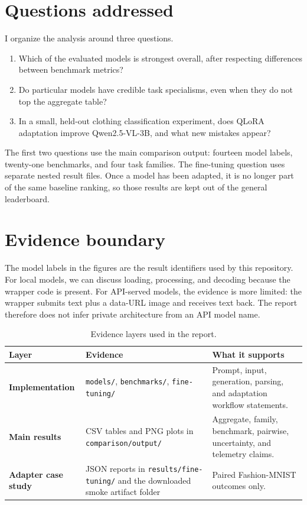 \documentclass[11pt,a4paper]{report}
\newcommand{\code}[1]{\texttt{#1}}
\begin{document}
\section{Questions addressed}
I organize the analysis around three questions.

\begin{enumerate}[leftmargin=22pt]
\item Which of the evaluated models is strongest overall, after respecting
      differences between benchmark metrics?
\item Do particular models have credible task specialisms, even when they do
      not top the aggregate table?
\item In a small, held-out clothing classification experiment, does QLoRA
      adaptation improve Qwen2.5-VL-3B, and what new mistakes appear?
\end{enumerate}

The first two questions use the main comparison output: fourteen model labels,
twenty-one benchmarks, and four task families.  The fine-tuning question uses
separate nested result files.  Once a model has been adapted, it is no longer
part of the same baseline ranking, so those results are kept out of the general
leaderboard.

\section{Evidence boundary}
The model labels in the figures are the result identifiers used by this
repository.  For local models, we can discuss loading, processing, and decoding
because the wrapper code is present.  For API-served models, the evidence is
more limited: the wrapper submits text plus a data-URL image and receives text
back.  The report therefore does not infer private architecture from an API
model name.

\begin{table}[H]
\centering
\caption{Evidence layers used in the report.}
\begin{tabularx}{\textwidth}{>{\bfseries}p{32mm} X X}
\toprule
Layer & Evidence & What it supports \\
\midrule
Implementation & \code{models/}, \code{benchmarks/}, \code{fine-tuning/} &
Prompt, input, generation, parsing, and adaptation workflow statements. \\
Main results & CSV tables and PNG plots in \code{comparison/output/} &
Aggregate, family, benchmark, pairwise, uncertainty, and telemetry claims. \\
Adapter case study & JSON reports in \code{results/fine-tuning/} and the
downloaded smoke artifact folder & Paired Fashion-MNIST outcomes only. \\
\bottomrule
\end{tabularx}
\end{table}
\end{document}
